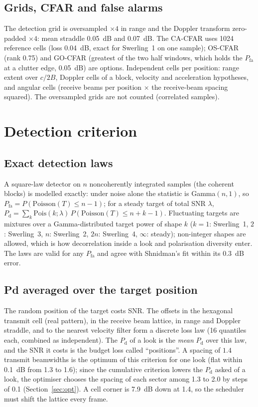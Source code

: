 \documentclass[11pt,a4paper]{article}
\newcommand{\Pd}{P_{\mathrm d}}
\newcommand{\Pfa}{P_{\mathrm{fa}}}
\begin{document}
\subsection{Grids, CFAR and false alarms}
The detection grid is oversampled $\times4$ in range and the Doppler transform zero-padded $\times4$: mean straddle
\SI{0.05}{dB} and \SI{0.07}{dB}. The CA-CFAR uses \num{1024} reference cells (loss \SI{0.04}{dB}, exact for
Swerling~1 on one sample); OS-CFAR (rank 0.75) and GO-CFAR (greatest of the two half windows, which holds the
$\Pfa$ at a clutter edge, \SI{0.05}{dB}) are options. Independent cells per position: range extent over $c/2B$,
Doppler cells of a block, velocity and acceleration hypotheses, and angular cells (receive beams per position $\times$
the receive-beam spacing squared). The oversampled grids are not counted (correlated samples).

\section{Detection criterion}\label{sec:det}

\subsection{Exact detection laws}
A square-law detector on $n$ noncoherently integrated samples (the coherent blocks) is modelled exactly: under noise
alone the statistic is Gamma$(n,1)$, so $\Pfa = P(\mathrm{Poisson}(T) \le n-1)$; for a steady target of total SNR
$\lambda$, $\Pd = \sum_k \mathrm{Pois}(k;\lambda)\,P(\mathrm{Poisson}(T)\le n+k-1)$. Fluctuating targets are mixtures
over a Gamma-distributed target power of shape $k$ ($k=1$: Swerling~1, $2$: Swerling~3, $n$: Swerling~2, $2n$:
Swerling~4, $\infty$: steady); non-integer shapes are allowed, which is how decorrelation inside a look and
polarisation diversity enter. The laws are valid for any $\Pfa$ and agree with Shnidman's fit within its
\SI{0.3}{dB} error.

\subsection{Pd averaged over the target position}
The random position of the target costs SNR. The offsets in the hexagonal transmit cell (real pattern), in the receive
beam lattice, in range and Doppler straddle, and to the nearest velocity filter form a discrete loss law (16 quantiles
each, combined as independent). The $\Pd$ of a look is the \emph{mean} $\Pd$ over this law, and the SNR it costs is
the budget loss called ``positions''. A spacing of $1.4$ transmit beamwidths is the optimum of this criterion for
one look (flat within \SI{0.1}{dB} from 1.3 to 1.6); since the cumulative criterion lowers the $\Pd$ asked of a look,
the optimiser chooses the spacing of each sector among 1.3 to 2.0 by steps of 0.1 (Section~\ref{sec:opt}). A cell
corner is \SI{7.9}{dB} down at 1.4, so the scheduler must shift the lattice every frame.
\end{document}
